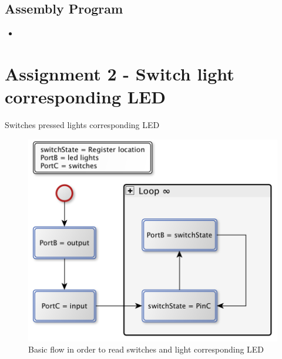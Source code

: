 \documentclass[a4paper, 12pt]{article}
\newcommand{\avrasm}[2]{
\begin{itemize}
\item[]
\end{itemize}
}
\begin{document}


\newpage
\subsection{Assembly Program}
\avrasm{../src/a1.asm}{}
\newpage

\section{Assignment 2 - Switch light corresponding LED}



\begin{algorithm}
\begin{algorithmic}
\Repeat
{} 
\Until{$\infty$}
\EndProcedure
\caption{Switches pressed lights corresponding LED}
\label{assign2.pseudo}
\end{algorithmic}
\end{algorithm}

\begin{figure}[h]
\includegraphics[scale=0.5]{Flowchart_pics/assignment2_pic.png} 
\caption{Basic flow in order to read switches and light corresponding LED}
\label{assign2.flow}
\end{figure}
\end{document}
